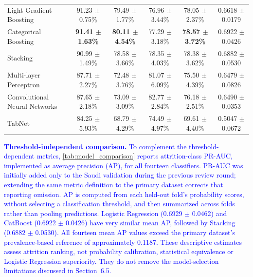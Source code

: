 \documentclass[a4paper,fleqn]{cas-sc}
\begin{document}
\begin{table}[width=1\linewidth,cols=6,pos=H]
{\begin{tabular}{lccccc}
Light Gradient Boosting & 91.23 $\pm$ 0.75\% & 79.49 $\pm$ 1.77\% & 76.96 $\pm$ 3.44\% & 78.05 $\pm$ 2.37\% & 0.6618 $\pm$ 0.0179 \\
Categorical Boosting & \textbf{91.41 $\pm$ 1.63\%} & \textbf{80.11 $\pm$ 4.54\%} & 77.29 $\pm$ 3.18\% & \textbf{78.57 $\pm$ 3.72\%} & 0.6922 $\pm$ 0.0426 \\
Stacking & 90.99 $\pm$ 1.49\% & 78.58 $\pm$ 3.66\% & 78.35 $\pm$ 4.03\% & 78.38 $\pm$ 3.62\% & 0.6882 $\pm$ 0.0530 \\
Multi-layer Perceptron & 87.71 $\pm$ 2.27\% & 72.48 $\pm$ 3.76\% & 81.07 $\pm$ 6.09\% & 75.50 $\pm$ 4.39\% & 0.6479 $\pm$ 0.0826 \\
Convolutional Neural Networks & 87.65 $\pm$ 2.18\% & 73.09 $\pm$ 3.09\% & 82.77 $\pm$ 2.84\% & 76.18 $\pm$ 2.51\% & 0.6490 $\pm$ 0.0353 \\
TabNet & 84.25 $\pm$ 5.93\% & 68.79 $\pm$ 4.29\% & 74.49 $\pm$ 4.97\% & 69.61 $\pm$ 4.40\% & 0.5047 $\pm$ 0.0672 \\
\bottomrule
\end{tabular}}
\end{table}

\textcolor{blue}{\textbf{Threshold-independent comparison.} To complement the threshold-dependent metrics, \cref{tab:model_comparison} reports attrition-class PR-AUC, implemented as average precision (AP), for all fourteen classifiers. PR-AUC was initially added only to the Saudi validation during the previous review round; extending the same metric definition to the primary dataset corrects that reporting omission. AP is computed from each held-out fold's probability scores, without selecting a classification threshold, and then summarized across folds rather than pooling predictions. Logistic Regression (0.6929 $\pm$ 0.0462) and CatBoost (0.6922 $\pm$ 0.0426) have very similar mean AP, followed by Stacking (0.6882 $\pm$ 0.0530). All fourteen mean AP values exceed the primary dataset's prevalence-based reference of approximately 0.1187. These descriptive estimates assess attrition ranking, not probability calibration, statistical equivalence or Logistic Regression superiority. They do not remove the model-selection limitations discussed in Section~6.5.}
\end{document}
